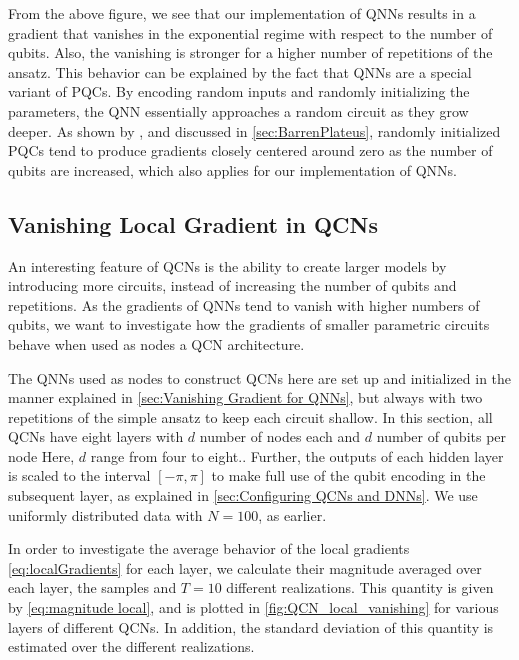 From the above figure, we see that our implementation of QNNs results in a gradient that vanishes in the exponential regime with respect to the number of qubits. Also, the vanishing is stronger for a higher number of repetitions of the ansatz. This behavior can be explained by the fact that QNNs are a special variant of PQCs. By encoding random inputs and randomly initializing the parameters, the QNN essentially approaches a random circuit as they grow deeper. As shown by \citet{McClean_2018}, and discussed in \cref{sec:BarrenPlateus}, randomly initialized PQCs tend to produce gradients closely centered around zero as the number of qubits are increased, which also applies for our implementation of QNNs.  

\subsection{Vanishing Local Gradient in QCNs}\label{sec:Vanishing Local Gradients in QCNs}

An interesting feature of QCNs is the ability to create larger models by introducing more circuits, instead of increasing the number of qubits and repetitions. As the gradients of QNNs tend to vanish with higher numbers of qubits, we want to investigate how the gradients of smaller parametric circuits behave when used as nodes a QCN architecture.

The QNNs used as nodes to construct QCNs here are set up and initialized in the manner explained in \cref{sec:Vanishing Gradient for QNNs}, but always with two repetitions of the simple ansatz to keep each circuit shallow. In this section, all QCNs have eight layers with $d$ number of nodes each and $d$ number of qubits per node Here, $d$ range from four to eight.. Further, the outputs of each hidden layer is scaled to the interval $[-\pi, \pi]$ to make full use of the qubit encoding in the subsequent layer, as explained in \cref{sec:Configuring QCNs and DNNs}. We use uniformly distributed data with $N=100$, as earlier.

In order to investigate the average behavior of the local gradients \cref{eq:localGradients} for each layer, we calculate their magnitude averaged over each layer, the samples and $T = 10$ different realizations. This quantity is given by \cref{eq:magnitude local}, and is plotted in \cref{fig:QCN_local_vanishing} for various layers of different QCNs. In addition, the standard deviation of this quantity is estimated over the different realizations. 

